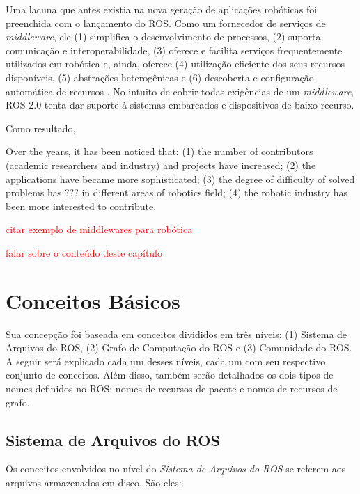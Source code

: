     Uma lacuna que antes existia na nova geração de aplicações robóticas foi preenchida com o lançamento do ROS. Como um fornecedor de serviços de \textit{middleware}, ele (1) simplifica o desenvolvimento de processos, (2) suporta comunicação e interoperabilidade, (3) oferece e facilita serviços frequentemente utilizados em robótica e, ainda, oferece (4) utilização eficiente dos seus recursos disponíveis, (5) abstrações heterogênicas e (6) descoberta e configuração automática de recursos \cite{ref:quigley2009ros}. No intuito de cobrir todas exigências de um \textit{middleware}, ROS 2.0 tenta dar suporte à sistemas embarcados e dispositivos de baixo recurso.
    
    Como resultado, 
    
    Over the years, it has been noticed that:
	(1) the number of contributors (academic researchers and industry) and projects have increased;
	(2) the applications have became more sophisticated;
	(3) the degree of difficulty of solved problems has ??? in different areas of robotics field;
	(4) the robotic industry has been more interested to contribute.
	
	\textcolor{red}{citar exemplo de middlewares para robótica}
    
    \textcolor{red}{falar sobre o conteúdo deste capítulo}
    
    \section{Conceitos Básicos} \label{sec:ros_conceitos}
    
        Sua concepção foi baseada em conceitos divididos em três níveis: (1) Sistema de Arquivos do ROS, (2) Grafo de Computação do ROS e (3) Comunidade do ROS. A seguir será explicado cada um desses níveis, cada um com seu respectivo conjunto de conceitos. Além disso, também serão detalhados os dois tipos de nomes definidos no ROS: nomes de recursos de pacote e nomes de recursos de grafo.
        
        \subsection{Sistema de Arquivos do ROS}
            
            Os conceitos envolvidos no nível do \textit{Sistema de Arquivos do ROS} se referem aos arquivos armazenados em disco. São eles:
            
